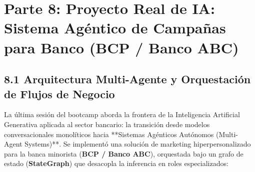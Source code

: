 \section{Parte 8: Proyecto Real de IA: Sistema Agéntico de Campañas para Banco (BCP / Banco ABC)}

\subsection{8.1 Arquitectura Multi-Agente y Orquestación de Flujos de Negocio}
La última sesión del bootcamp aborda la frontera de la Inteligencia Artificial Generativa aplicada al sector bancario: la transición desde modelos conversacionales monolíticos hacia **Sistemas Agénticos Autónomos (Multi-Agent Systems)**. Se implementó una solución de marketing hiperpersonalizado para la banca minorista (\textbf{BCP / Banco ABC}), orquestada bajo un grafo de estado (\textbf{StateGraph}) que desacopla la inferencia en roles especializados:

